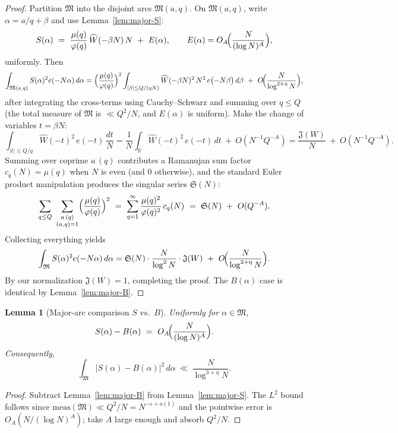 \documentclass[11pt]{article}
\newtheorem{lemma}{Lemma}[part]
\theoremstyle{definition}
\theoremstyle{remark}
\numberwithin{equation}{part}
\begin{document}
\begin{proof}
	Partition $\mathfrak M$ into the disjoint arcs $\mathfrak M(a,q)$.
	On $\mathfrak M(a,q)$, write $\alpha=a/q+\beta$ and use Lemma~\ref{lem:major-S}:
	\[
		S(\alpha)\ =\ \frac{\mu(q)}{\varphi(q)}\,\widehat W(-\beta N)\,N\ +\ E(\alpha),
		\qquad E(\alpha)=O_A\!\Bigl(\frac{N}{(\log N)^A}\Bigr),
	\]
	uniformly.
	Then
	\[
		\int_{\mathfrak M(a,q)} S(\alpha)^2 e(-N\alpha)\,d\alpha
		= \Bigl(\frac{\mu(q)}{\varphi(q)}\Bigr)^2
		\int_{|\beta|\le Q/(qN)} \widehat W(-\beta N)^2\,N^2\,e\bigl(-N\beta\bigr)\,d\beta
		\ +\ O\!\Bigl(\frac{N}{\log^{2+\eta} N}\Bigr),
	\]
	after integrating the cross-terms using Cauchy--Schwarz and summing over $q\le Q$ (the total measure of $\mathfrak M$ is $\ll Q^2/N$, and $E(\alpha)$ is uniform).
	Make the change of variables $t=\beta N$:
	\[
		\int_{|t|\le Q/q} \widehat W(-t)^2\,e(-t)\,\frac{dt}{N}
		= \frac{1}{N}\int_{\mathbb R}\widehat W(-t)^2\,e(-t)\,dt\ +\ O(N^{-1}Q^{-A})
		= \frac{\mathfrak J(W)}{N}\ +\ O(N^{-1}Q^{-A}).
	\]
	Summing over coprime $a\,(q)$ contributes a Ramanujan sum factor $c_q(N)=\mu(q)$ when $N$ is even (and $0$ otherwise), and the standard Euler product manipulation produces the singular series $\mathfrak S(N)$:
	\[
		\sum_{q\le Q}\ \sum_{\substack{a\,(q)\\(a,q)=1}} \Bigl(\frac{\mu(q)}{\varphi(q)}\Bigr)^2
		\ =\ \sum_{q=1}^\infty \frac{\mu(q)^2}{\varphi(q)^2}\,c_q(N)
		\ =\ \mathfrak S(N)\ +\ O(Q^{-A}).
	\]
	Collecting everything yields
	\[
		\int_{\mathfrak M} S(\alpha)^2 e(-N\alpha)\,d\alpha
		= \mathfrak S(N)\cdot \frac{N}{\log^2 N}\cdot \mathfrak J(W)\ +\ O\!\Bigl(\frac{N}{\log^{2+\eta}N}\Bigr).
	\]
	By our normalization $\mathfrak J(W)=1$, completing the proof.
	The $B(\alpha)$ case is identical by Lemma~\ref{lem:major-B}.
\end{proof}

\begin{lemma}[Major-arc comparison $S$ vs.\ $B$]\label{lem:major-comparison}
	Uniformly for $\alpha\in\mathfrak M$,
	\[
		S(\alpha)-B(\alpha)\ =\ O_A\!\Bigl(\frac{N}{(\log N)^A}\Bigr).
	\]
	Consequently,
	\[
		\int_{\mathfrak M} |S(\alpha)-B(\alpha)|^2\,d\alpha \ \ll\ \frac{N}{\log^{3+\eta} N}.
	\]
\end{lemma}

\begin{proof}
	Subtract Lemma~\ref{lem:major-B} from Lemma~\ref{lem:major-S}.
	The $L^2$ bound follows since $\mathrm{meas}(\mathfrak M)\ll Q^2/N=N^{-\varepsilon+o(1)}$ and the pointwise error is $O_A(N/(\log N)^A)$; take $A$ large enough and absorb $Q^2/N$.
\end{proof}
\end{document}

